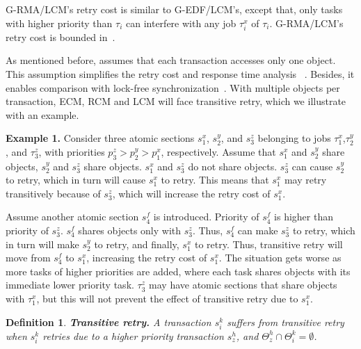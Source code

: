 \documentclass[twocolumn]{article}
\newtheorem{mydef}{Definition}
\begin{document}
G-RMA/LCM's retry cost is similar to G-EDF/LCM's, except that, only tasks with higher priority than $\tau_i$ can interfere with any job $\tau_i^x$ of $\tau_i$. G-RMA/LCM's retry cost is bounded 
in~\cite{lcmdac2012}.


As mentioned before, \cite{stmconcurrencycontrol:emsoft11,lcmdac2012} assumes that each transaction accesses only one object. This assumption simplifies the retry cost 
and response time analysis
~\cite{stmconcurrencycontrol:emsoft11,lcmdac2012}. Besides, it enables comparison with lock-free synchronization~\cite{key-5}. With multiple objects per transaction, ECM, RCM and LCM will face transitive retry, which we illustrate with an example.

\textbf{Example 1.} Consider three atomic sections $s_{1}^{x}$, $s_{2}^{y}$, 
and $s_{3}^{z}$ belonging to jobs $\tau_{1}^{x}$,$\tau_{2}^{y}$, 
and $\tau_{3}^{z}$, with priorities $p_{3}^{z}>p_{2}^{y}>p_{1}^{x}$, respectively. 
Assume that $s_{1}^{x}$ and $s_{2}^{y}$ share objects, $s_{2}^{y}$ and $s_{3}^{z}$
share objects. $s_{1}^{x}$ and $s_{3}^{z}$ do not share objects.
$s_{3}^{z}$ can cause $s_{2}^{y}$ to retry, which in turn will cause $s_{1}^{x}$ to retry. 
This means that $s_{1}^{x}$ may retry transitively
because of $s_{3}^{z}$, which will increase the retry cost of $s_{1}^{x}$.

Assume another atomic section $s_4^f$ is introduced. Priority of $s_4^f$ is higher than priority of $s_3^z$. $s_4^f$ shares objects only with $s_3^z$. Thus, $s_4^f$ can make $s_3^z$ to retry, which in turn will make $s_2^y$ to retry, and finally, $s_1^x$ to retry. Thus, transitive retry will move from $s_{4}^{f}$ to $s_{1}^{x}$, increasing the retry cost of $s_{1}^{x}$. 
The situation gets worse as more tasks of higher priorities are added, where each task
shares objects with its immediate lower priority task. $\tau_{3}^{z}$
may have atomic sections that share objects with $\tau_{1}^{x}$,
but this will not prevent the effect of transitive retry due to $s_{1}^{x}$.

\begin{mydef}
\label{defn:trans-retry}
\textbf{Transitive retry.} A transaction $s_{i}^{k}$ suffers from
transitive retry when $s_i^k$ retries due to a higher priority transaction $s_z^h$, and $\Theta_z^h \cap \Theta_i^k=\emptyset$.
\end{mydef}
\end{document}
